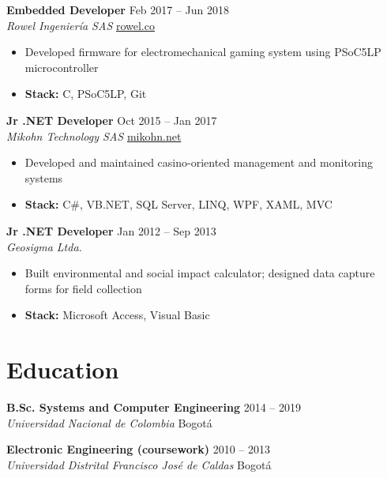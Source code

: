 \documentclass[11pt,a4paper]{article}
\begin{document}
\textbf{Embedded Developer} \hfill {\color{lighttext} Feb 2017 -- Jun 2018} \\
\textit{Rowel Ingenier\'{i}a SAS} \hfill \href{https://www.rowel.co}{rowel.co}
\begin{itemize}
    \item Developed firmware for electromechanical gaming system using PSoC5LP microcontroller
    \item \textbf{Stack:} C, PSoC5LP, Git
\end{itemize}

\vspace{4pt}

\textbf{Jr .NET Developer} \hfill {\color{lighttext} Oct 2015 -- Jan 2017} \\
\textit{Mikohn Technology SAS} \hfill \href{https://www.mikohn.net}{mikohn.net}
\begin{itemize}
    \item Developed and maintained casino-oriented management and monitoring systems
    \item \textbf{Stack:} C\#, VB.NET, SQL Server, LINQ, WPF, XAML, MVC
\end{itemize}

\vspace{4pt}

\textbf{Jr .NET Developer} \hfill {\color{lighttext} Jan 2012 -- Sep 2013} \\
\textit{Geosigma Ltda.}
\begin{itemize}
    \item Built environmental and social impact calculator; designed data capture forms for field collection
    \item \textbf{Stack:} Microsoft Access, Visual Basic
\end{itemize}

\section{Education}

\textbf{B.Sc. Systems and Computer Engineering} \hfill {\color{lighttext} 2014 -- 2019} \\
\textit{Universidad Nacional de Colombia} \hfill Bogot\'{a}

\vspace{4pt}

\textbf{Electronic Engineering (coursework)} \hfill {\color{lighttext} 2010 -- 2013} \\
\textit{Universidad Distrital Francisco Jos\'{e} de Caldas} \hfill Bogot\'{a}
\end{document}
